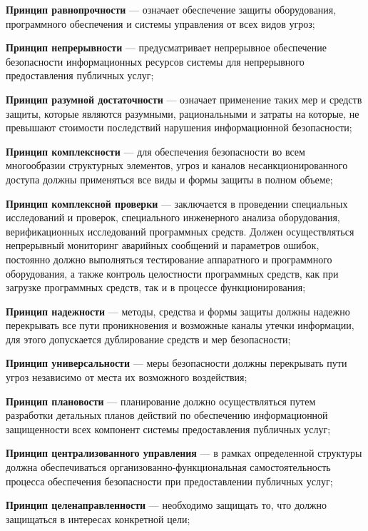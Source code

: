 \begin{textitemize}
	\item \textbf{Принцип равнопрочности} --- означает обеспечение защиты оборудования, программного обеспечения и системы управления от всех видов угроз;
	\item \textbf{Принцип непрерывности} --- предусматривает непрерывное обеспечение безопасности информационных ресурсов системы для непрерывного предоставления публичных услуг;
	\item \textbf{Принцип разумной достаточности} --- означает применение таких мер и средств защиты, которые являются разумными, рациональными и затраты на которые, не превышают стоимости последствий нарушения информационной безопасности;
	\item \textbf{Принцип комплексности} --- для обеспечения безопасности во всем многообразии структурных элементов, угроз и каналов несанкционированного доступа должны применяться все виды и формы защиты в полном объеме;
	\item \textbf{Принцип комплексной проверки} --- заключается в проведении специальных исследований и проверок, специального инженерного анализа оборудования, верификационных исследований программных средств. Должен осуществляться непрерывный мониторинг аварийных сообщений и параметров ошибок, постоянно должно выполняться тестирование аппаратного и программного оборудования, а также контроль целостности программных средств, как при загрузке программных средств, так и в процессе функционирования;
	\item \textbf{Принцип надежности} --- методы, средства и формы защиты должны надежно перекрывать все пути проникновения и возможные каналы утечки информации, для этого допускается дублирование средств и мер безопасности;
	\item \textbf{Принцип универсальности} --- меры безопасности должны перекрывать пути угроз независимо от места их возможного воздействия;
	\item \textbf{Принцип плановости} --- планирование должно осуществляться путем разработки детальных планов действий по обеспечению информационной защищенности всех компонент системы предоставления публичных услуг;
	\item \textbf{Принцип централизованного управления} --- в рамках определенной структуры должна обеспечиваться организованно-функциональная самостоятельность процесса обеспечения безопасности при предоставлении публичных услуг;
	\item \textbf{Принцип целенаправленности} --- необходимо защищать то, что должно защищаться в интересах конкретной цели;

\end{textitemize}
